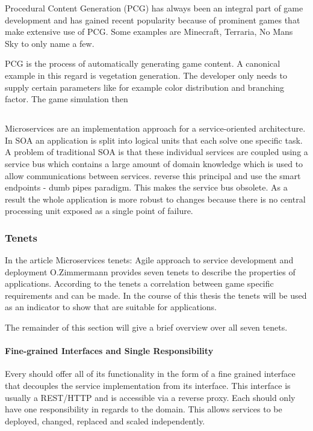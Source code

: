 Procedural Content Generation (PCG) has always been an integral part of game
development and has gained recent popularity because of prominent games that
make extensive use of PCG. Some examples are Minecraft, Terraria, No Mans Sky to
only name a few.

PCG is the process of automatically generating game content. A canonical
example in this regard is vegetation generation. The developer only needs to
supply certain parameters like for example color distribution and branching
factor. The game simulation then 

\subsection{\mss{}}

Microservices are an implementation approach for a service-oriented
architecture. In SOA an application is split into logical units
that each solve one specific task. A problem of traditional SOA is that these
individual services are coupled using a service bus which contains a large
amount of domain knowledge which is used to allow communications between
services. \mss{} reverse this principal and use the smart endpoints - dumb pipes
paradigm. This makes the service bus obsolete. As a result the whole
application is more robust to changes because there is no central processing
unit exposed as a single point of failure.

\subsubsection{\ms{} Tenets}

In the article Microservices tenets: Agile approach to service development and
deployment O.Zimmermann provides seven \ms{} tenets to describe the properties
of \ms{} applications. According to the tenets a correlation between game
specific requirements and \ogs{} can be made. In the course of this thesis the
\ms{} tenets will be used as an indicator to show that \mss{} are suitable for
\og{} applications.

The remainder of this section will give a brief overview over all seven tenets.

\paragraph{Fine-grained Interfaces and Single Responsibility}

Every \ms{} should offer all of its functionality in the form of a fine grained
interface that decouples the service implementation from its interface. This
interface is usually a REST/HTTP and is accessible via a reverse proxy. Each
\ms{} should only have one responsibility in regards to the domain. This allows
services to be deployed, changed, replaced and scaled independently.


